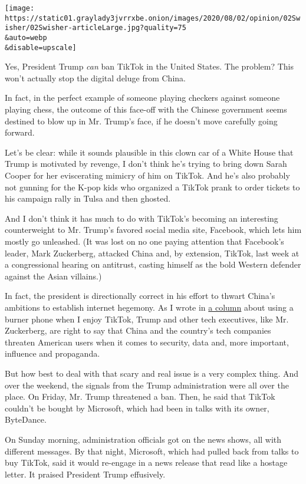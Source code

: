 \texttt{[image: https://static01.graylady3jvrrxbe.onion/images/2020/08/02/opinion/02Swisher/02Swisher-articleLarge.jpg?quality=75\\\&auto=webp\\\&disable=upscale]}

Yes, President Trump \emph{can} ban TikTok in the United States. The
problem? This won't actually stop the digital deluge from China.

In fact, in the perfect example of someone playing checkers against
someone playing chess, the outcome of this face-off with the Chinese
government seems destined to blow up in Mr. Trump's face, if he doesn't
move carefully going forward.

Let's be clear: while it sounds plausible in this clown car of a White
House that Trump is motivated by revenge, I don't think he's trying to
bring down Sarah Cooper for her eviscerating mimicry of him on TikTok.
And he's also probably not gunning for the K-pop kids who organized a
TikTok prank to order tickets to his campaign rally in Tulsa and then
ghosted.

And I don't think it has much to do with TikTok's becoming an
interesting counterweight to Mr. Trump's favored social media site,
Facebook, which lets him mostly go unleashed. (It was lost on no one
paying attention that Facebook's leader, Mark Zuckerberg, attacked China
and, by extension, TikTok, last week at a congressional hearing on
antitrust, casting himself as the bold Western defender against the
Asian villains.)

In fact, the president is directionally correct in his effort to thwart
China's ambitions to establish internet hegemony. As I wrote in
\href{https://www.nytimes3xbfgragh.onion/2020/07/17/opinion/tiktok-ban-china.html}{a
column} about using a burner phone when I enjoy TikTok, Trump and other
tech executives, like Mr. Zuckerberg, are right to say that China and
the country's tech companies threaten American users when it comes to
security, data and, more important, influence and propaganda.

But how best to deal with that scary and real issue is a very complex
thing. And over the weekend, the signals from the Trump administration
were all over the place. On Friday, Mr. Trump threatened a ban. Then, he
said that TikTok couldn't be bought by Microsoft, which had been in
talks with its owner, ByteDance.

On Sunday morning, administration officials got on the news shows, all
with different messages. By that night, Microsoft, which had pulled back
from talks to buy TikTok, said it would re-engage in a news release that
read like a hostage letter. It praised President Trump effusively.

